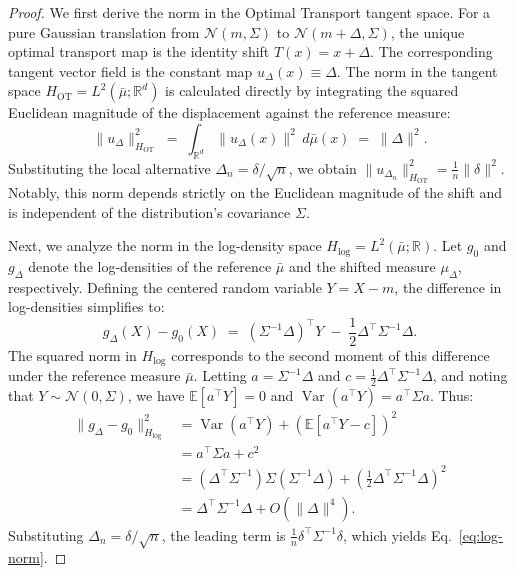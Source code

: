 \documentclass{article}
\theoremstyle{plain}
\theoremstyle{definition}
\theoremstyle{remark}
\begin{document}
\begin{proof}
We first derive the norm in the Optimal Transport tangent space. For a pure Gaussian translation from $\mathcal{N}(m, \Sigma)$ to $\mathcal{N}(m+\Delta, \Sigma)$, the unique optimal transport map is the identity shift $T(x) = x + \Delta$. The corresponding tangent vector field is the constant map $u_{\Delta}(x) \equiv \Delta$.
The norm in the tangent space $H_{\mathrm{OT}} = L^2(\bar\mu; \mathbb{R}^d)$ is calculated directly by integrating the squared Euclidean magnitude of the displacement against the reference measure:
\[
  \|u_{\Delta}\|_{H_{\mathrm{OT}}}^2
  \;=\; \int_{\mathbb{R}^d} \|u_{\Delta}(x)\|^2 \, d\bar\mu(x)
  \;=\; \|\Delta\|^2.
\]
Substituting the local alternative $\Delta_n = \delta/\sqrt n$, we obtain $\|u_{\Delta_n}\|_{H_{\mathrm{OT}}}^2 = \frac{1}{n}\|\delta\|^2$. Notably, this norm depends strictly on the Euclidean magnitude of the shift and is independent of the distribution's covariance $\Sigma$.

Next, we analyze the norm in the log-density space $H_{\log} = L^2(\bar\mu; \mathbb{R})$. Let $g_0$ and $g_{\Delta}$ denote the log-densities of the reference $\bar\mu$ and the shifted measure $\mu_{\Delta}$, respectively.
Defining the centered random variable $Y = X - m$, the difference in log-densities simplifies to:
\[
  g_\Delta(X) - g_0(X) \;=\; (\Sigma^{-1}\Delta)^\top Y \;-\; \frac{1}{2}\Delta^\top \Sigma^{-1}\Delta.
\]
The squared norm in $H_{\log}$ corresponds to the second moment of this difference under the reference measure $\bar\mu$. Letting $a = \Sigma^{-1}\Delta$ and $c = \frac{1}{2}\Delta^\top \Sigma^{-1}\Delta$, and noting that $Y \sim \mathcal{N}(0, \Sigma)$, we have $\mathbb{E}[a^\top Y] = 0$ and $\operatorname{Var}(a^\top Y) = a^\top \Sigma a$. Thus:
\begin{align*}
  \|g_\Delta - g_0\|_{H_{\log}}^2
  &= \operatorname{Var}(a^\top Y) + (\mathbb{E}[a^\top Y - c])^2 \\
  &= a^\top \Sigma a + c^2 \\
  &= (\Delta^\top \Sigma^{-1}) \Sigma (\Sigma^{-1}\Delta) + \left(\frac{1}{2}\Delta^\top \Sigma^{-1}\Delta\right)^2 \\
  &= \Delta^\top \Sigma^{-1} \Delta + O(\|\Delta\|^4).
\end{align*}
Substituting $\Delta_n = \delta/\sqrt{n}$, the leading term is $\frac{1}{n} \delta^\top \Sigma^{-1} \delta$, which yields Eq.~\eqref{eq:log-norm}.
\end{proof}
\end{document}
